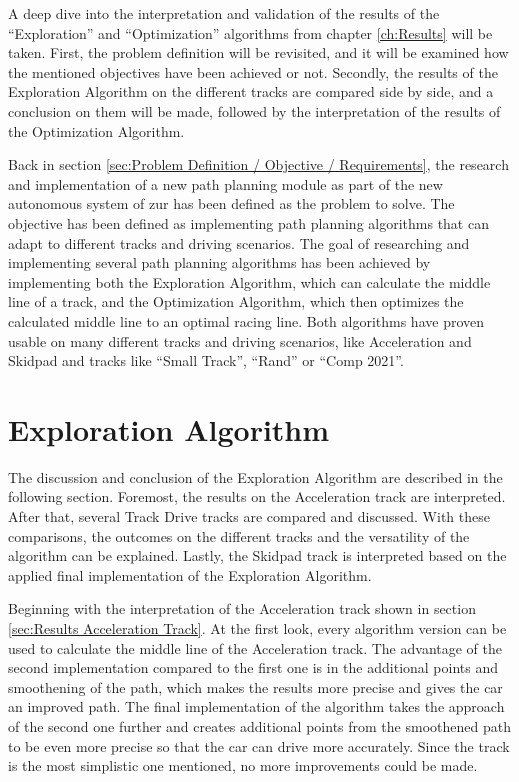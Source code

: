 A deep dive into the interpretation and validation of the results of the ``Exploration'' and ``Optimization'' algorithms from chapter \ref{ch:Results} will be taken. First, the problem definition will be revisited, and it will be examined how the mentioned objectives have been achieved or not. Secondly, the results of the Exploration Algorithm on the different tracks are compared side by side, and a conclusion on them will be made, followed by the interpretation of the results of the Optimization Algorithm.

Back in section \ref{sec:Problem Definition / Objective / Requirements}, the research and implementation of a new path planning module as part of the new autonomous system of \acrlong{zur} has been defined as the problem to solve. The objective has been defined as implementing path planning algorithms that can adapt to different tracks and driving scenarios. The goal of researching and implementing several path planning algorithms has been achieved by implementing both the Exploration Algorithm, which can calculate the middle line of a track, and the Optimization Algorithm, which then optimizes the calculated middle line to an optimal racing line. Both algorithms have proven usable on many different tracks and driving scenarios, like Acceleration and Skidpad and tracks like ``Small Track'', ``Rand'' or ``Comp 2021''.

\section{Exploration Algorithm}
The discussion and conclusion of the Exploration Algorithm are described in the following section. Foremost, the results on the Acceleration track are interpreted. After that, several Track Drive tracks are compared and discussed. With these comparisons, the outcomes on the different tracks and the versatility of the algorithm can be explained. Lastly, the Skidpad track is interpreted based on the applied final implementation of the Exploration Algorithm.

Beginning with the interpretation of the Acceleration track shown in section \ref{sec:Results Acceleration Track}. At the first look, every algorithm version can be used to calculate the middle line of the Acceleration track. The advantage of the second implementation compared to the first one is in the additional points and smoothening of the path, which makes the results more precise and gives the car an improved path. The final implementation of the algorithm takes the approach of the second one further and creates additional points from the smoothened path to be even more precise so that the car can drive more accurately. Since the track is the most simplistic one mentioned, no more improvements could be made.

